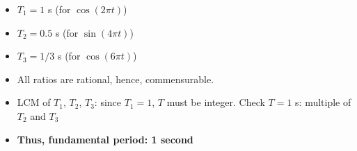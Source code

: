 \documentclass[12pt, xcolor=dvipsnames,svgnames,x11names]{article}
\begin{document}
\begin{enumerate}
\begin{tcolorbox}
\begin{itemize}
    \item $T_1 = 1 $ s (for $\cos(2\pi t)$)
    \item $T_2 = 0.5 $ s (for $\sin(4\pi t)$)
    \item $T_3 = 1/3 $ s (for $\cos(6\pi t)$)
    \item All ratios are rational, hence, commensurable.
    \item LCM of $T_1 $, $T_2 $, $T_3 $: since $T_1 = 1 $, $T $ must be integer. Check $T = 1 $ s: multiple of $T_2 $ and $T_3 $
    \item \textbf{Thus, fundamental period: 1 second}
\end{itemize}
    
\end{tcolorbox}

\end{enumerate}
\end{document}

